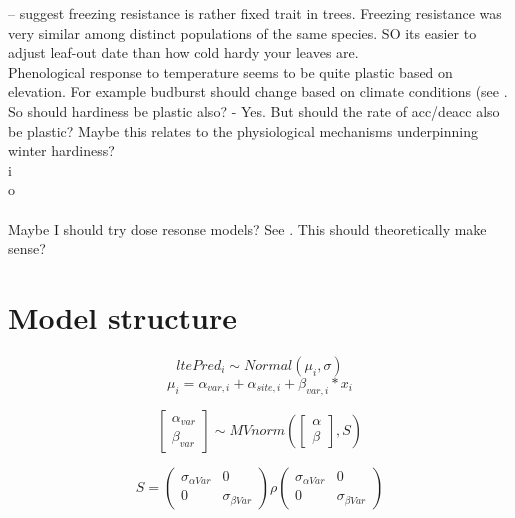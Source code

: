 \documentclass[11pt,letter]{article}
\begin{document}
\cite{Lenz2016} – suggest freezing resistance is rather fixed trait in trees. Freezing resistance was very similar among distinct populations of the same species. SO its easier to adjust leaf-out date than how cold hardy your leaves are. \\

Phenological response to temperature seems to be quite plastic based on elevation. For example budburst should change based on climate conditions (see \citep{Caffarra2010}. So should hardiness be plastic also? - Yes. But should the rate of acc/deacc also be plastic? Maybe this relates to the physiological mechanisms underpinning winter hardiness? \\

i\\
o\\
\\

Maybe I should try dose resonse models? See \cite{Ritz2015}. This should theoretically make sense? 

\section{Model structure}

\begin{equation*}
ltePred_{i} \sim Normal(\mu_{i}, \sigma ) 
\end{equation*}
\begin{equation*}
\mu_{i} = \alpha_{var,i} + \alpha_{site, i}+ \beta_{var, i}\ast x_{i}
\end{equation*}

\begin{equation*}
\begin{bmatrix}
\alpha_{var} \\
\beta_{var}
\end{bmatrix}
\sim MVnorm
\left(
\begin{bmatrix}
\alpha \\
\beta
\end{bmatrix}
,S
\right)
\end{equation*}

\begin{equation*}
S = 
\begin{pmatrix}
\sigma_{\alpha Var} & 0 \\
0 & \sigma_{\beta Var} 
\end{pmatrix}
\rho
\begin{pmatrix}
\sigma_{\alpha Var} & 0 \\
0 & \sigma_{\beta Var} 
\end{pmatrix}
\end{equation*}
\end{document}
